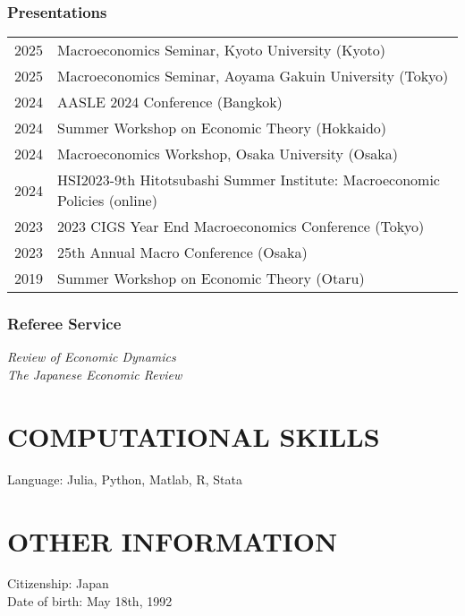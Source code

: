 \documentclass[12pt]{article}
\begin{document}
\subsubsection*{Presentations}
\begin{tabular}{@{}ll}
2025&Macroeconomics Seminar, Kyoto University (Kyoto)\\
2025&Macroeconomics Seminar, Aoyama Gakuin University (Tokyo)\\
2024&AASLE 2024 Conference (Bangkok)\\
2024&Summer Workshop on Economic Theory (Hokkaido)\\
2024&Macroeconomics Workshop, Osaka University (Osaka)\\
2024&HSI2023-9th Hitotsubashi Summer Institute: Macroeconomic Policies (online)\\
2023&2023 CIGS Year End Macroeconomics Conference (Tokyo)\\
2023&25th Annual Macro Conference (Osaka)\\
2019&Summer Workshop on Economic Theory (Otaru)
\end{tabular}
\subsubsection*{Referee Service}
\textit{Review of Economic Dynamics}\\
\textit{The Japanese Economic Review}

\section*{COMPUTATIONAL SKILLS}
Language: Julia, Python, Matlab, R, Stata

\section*{OTHER INFORMATION}
Citizenship: Japan\\
Date of birth: May 18th, 1992
\end{document}
